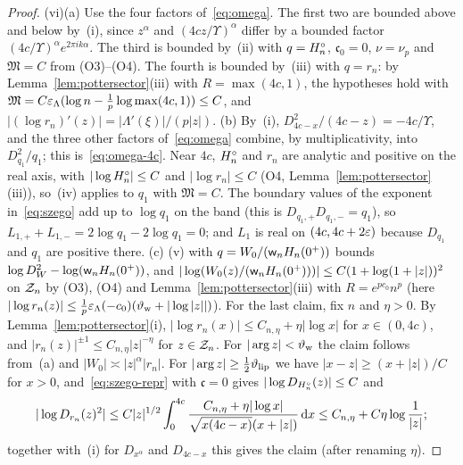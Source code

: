 \begin{proof}
(vi)(a) Use the four factors of~\eqref{eq:omega}. The first two are bounded above and below by~(i), since $z^\alpha$ and
$(4cz/\Upsilon)^\alpha$ differ by a bounded factor $(4c/\Upsilon)^\alpha e^{2\pi ik\alpha}$. The third is bounded by~(ii) with
$q=H^{\circ}_n$, $\mathfrak c_0=0$, $\nu=\nu_p$ and $\mathfrak M=C$ from (O3)--(O4). The fourth is bounded by~(iii) with $q=r_n$: by
Lemma~\ref{lem:pottersector}(iii) with $R=\max(4c,1)$, the hypotheses hold with
$\mathfrak M=C\varepsilon_\Lambda(\log n-\frac1p\log\max(4c,1))\le C$, and $|(\log r_n)'(z)|=|\Lambda'(\xi)|/(p|z|)$.
(b) By~(i), $D_{4c-x}^2/(4c-z)=-4c/\Upsilon$, and the three other factors of~\eqref{eq:omega} combine, by
multiplicativity, into $D_{q_1}^2/q_1$; this is~\eqref{eq:omega-4c}. Near $4c$, $H^{\circ}_n$ and $r_n$ are analytic and
positive on the real axis, with $|\log H^{\circ}_n|\le C$ and $|\log r_n|\le C$ (O4, Lemma~\ref{lem:pottersector}(iii)), so~(iv)
applies to $q_1$ with $\mathfrak M=C$. The boundary values of the exponent in~\eqref{eq:szego} add up to $\log q_1$ on the band
(this is $D_{q_1,+}D_{q_1,-}=q_1$), so $L_{1,+}+L_{1,-}=2\log q_1-2\log q_1=0$; and $L_1$ is real on $(4c,4c+2\varepsilon)$
because $D_{q_1}$ and $q_1$ are positive there.
(c) (v) with $q=W_0/(\mathsf w_n H_n(0^+))$ bounds $\log D_W^2-\log(\mathsf w_n H_n(0^+))$, and
$|\log(W_0(z)/(\mathsf w_n H_n(0^+)))|\le C(1+\log(1+|z|))^2$ on $\mathcal{Z}_n$ by (O3), (O4) and Lemma~\ref{lem:pottersector}(iii) with
$R=e^{pc_0}n^p$ (here $|\log r_n(z)|\le\frac1p\varepsilon_\Lambda(-c_0)(\vartheta_{\mathrm{w}}+|\log|z||)$).
For the last claim, fix $n$ and $\eta>0$. By Lemma~\ref{lem:pottersector}(i),
$|\log r_n(x)|\le C_{n,\eta}+\eta|\log x|$ for $x\in(0,4c)$, and $|r_n(z)|^{\pm1}\le C_{n,\eta}|z|^{-\eta}$ for $z\in\mathcal{Z}_n$. For
$|\arg z|<\vartheta_{\mathrm{w}}$ the claim follows from~(a) and $|W_0|\asymp|z|^\alpha|r_n|$. For $|\arg z|\ge\frac12\vartheta_{\mathrm{lip}}$ we have
$|x-z|\ge(x+|z|)/C$ for $x>0$, and~\eqref{eq:szego-repr} with $\mathfrak c=0$ gives $|\log D_{H^{\circ}_n}(z)|\le C$ and
\[
  |\log D_{r_n}(z)^2|\le C|z|^{1/2}\int_0^{4c}\frac{C_{n,\eta}+\eta|\log x|}{\sqrt{x(4c-x)}(x+|z|)}\,\mathrm{d} x\le C_{n,\eta}+C\eta\log\frac1{|z|};
\]
together with~(i) for $D_{x^\alpha}$ and $D_{4c-x}$ this gives the claim (after renaming $\eta$).
\end{proof}

